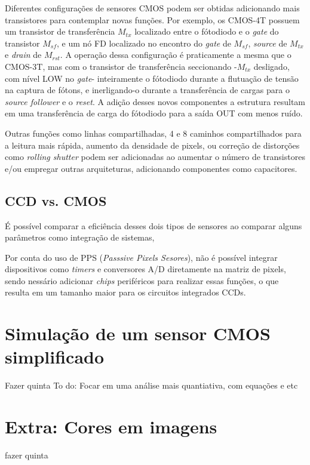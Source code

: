 \documentclass[10pt,a4paper,twocolumn]{article}
\begin{document}
	Diferentes configurações de sensores CMOS podem ser obtidas adicionando mais transistores para contemplar novas funções. Por exemplo, os CMOS-4T possuem um transistor de transferência $M_{tx}$ localizado entre o fótodiodo e o \textit{gate} do transistor $M_{sf}$, e um nó FD localizado no encontro do \textit{gate} de $M_{sf}$, \textit{source} de $M_{tx}$ e \textit{drain} de $M_{rst}$. A operação dessa configuração é praticamente a mesma que o CMOS-3T, mas com o transistor de transferência seccionando -$M_{tx}$ desligado, com nível LOW no \textit{gate}- inteiramente o fótodiodo durante a flutuação de tensão na captura de fótons, e inerligando-o durante a transferência de cargas para o \textit{source follower} e o \textit{reset}. A adição desses novos componentes a estrutura resultam em uma transferência de carga do fótodiodo para a saída OUT com menos ruído.
	
	Outras funções como linhas compartilhadas, 4 e 8 caminhos compartilhados para a leitura mais rápida, aumento da densidade de pixels, ou correção de distorções como \textit{rolling shutter} podem ser adicionadas ao aumentar o número de transistores e/ou empregar outras arquiteturas, adicionando componentes como capacitores.
	
	\subsection*{CCD vs. CMOS}
	É possível comparar a eficiência desses dois tipos de sensores ao comparar alguns parâmetros como integração de sistemas, 
	
	Por conta do uso de PPS (\textit{Passsive Pixels Sesores}), não é possível integrar dispositivos como \textit{timers} e conversores A/D diretamente na matriz de pixels, sendo nessário adicionar \textit{chips} periféricos para realizar essas funções, o que resulta em um tamanho maior para os circuitos integrados CCDs.

	\section*{Simulação de um sensor CMOS simplificado}
	Fazer quinta	
	To do: Focar em uma análise mais quantiativa, com equações e etc
	
	\section{Extra: Cores em imagens}
	fazer quinta
\end{document}
